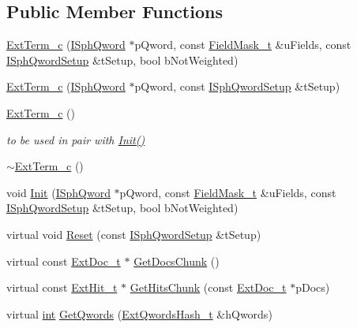 \subsection*{Public Member Functions}
\begin{DoxyCompactItemize}
\item 
\hyperlink{classExtTerm__c_a47e8a0b7e068fdd5feb1a82e08638c8b}{Ext\-Term\-\_\-c} (\hyperlink{classISphQword}{I\-Sph\-Qword} $\ast$p\-Qword, const \hyperlink{structFieldMask__t}{Field\-Mask\-\_\-t} \&u\-Fields, const \hyperlink{classISphQwordSetup}{I\-Sph\-Qword\-Setup} \&t\-Setup, bool b\-Not\-Weighted)
\item 
\hyperlink{classExtTerm__c_a4221fa2c63a3f0a9618bc283a9e92ae5}{Ext\-Term\-\_\-c} (\hyperlink{classISphQword}{I\-Sph\-Qword} $\ast$p\-Qword, const \hyperlink{classISphQwordSetup}{I\-Sph\-Qword\-Setup} \&t\-Setup)
\item 
\hyperlink{classExtTerm__c_a4384bb8c1c801a83d4a751bd81a36d1e}{Ext\-Term\-\_\-c} ()
\begin{DoxyCompactList}\small\item\em to be used in pair with \hyperlink{classExtTerm__c_a1f8e26a277933b007891286333f622ba}{Init()} \end{DoxyCompactList}\item 
\hyperlink{classExtTerm__c_a6bd6db43f352379c04d0422ef811c385}{$\sim$\-Ext\-Term\-\_\-c} ()
\item 
void \hyperlink{classExtTerm__c_a1f8e26a277933b007891286333f622ba}{Init} (\hyperlink{classISphQword}{I\-Sph\-Qword} $\ast$p\-Qword, const \hyperlink{structFieldMask__t}{Field\-Mask\-\_\-t} \&u\-Fields, const \hyperlink{classISphQwordSetup}{I\-Sph\-Qword\-Setup} \&t\-Setup, bool b\-Not\-Weighted)
\item 
virtual void \hyperlink{classExtTerm__c_a187c62d5a36afc352025de69fc0419d8}{Reset} (const \hyperlink{classISphQwordSetup}{I\-Sph\-Qword\-Setup} \&t\-Setup)
\item 
virtual const \hyperlink{structExtDoc__t}{Ext\-Doc\-\_\-t} $\ast$ \hyperlink{classExtTerm__c_ad615045143580b61798180f25df774be}{Get\-Docs\-Chunk} ()
\item 
virtual const \hyperlink{structExtHit__t}{Ext\-Hit\-\_\-t} $\ast$ \hyperlink{classExtTerm__c_a0ab91a1da71996bea098ab1b757d0d3c}{Get\-Hits\-Chunk} (const \hyperlink{structExtDoc__t}{Ext\-Doc\-\_\-t} $\ast$p\-Docs)
\item 
virtual \hyperlink{sphinxexpr_8cpp_a4a26e8f9cb8b736e0c4cbf4d16de985e}{int} \hyperlink{classExtTerm__c_a039473387307696891a09794ca18df60}{Get\-Qwords} (\hyperlink{sphinxsearch_8cpp_a814fc096e1ffb29d072d79b72b702fe6}{Ext\-Qwords\-Hash\-\_\-t} \&h\-Qwords)

\end{DoxyCompactItemize}
